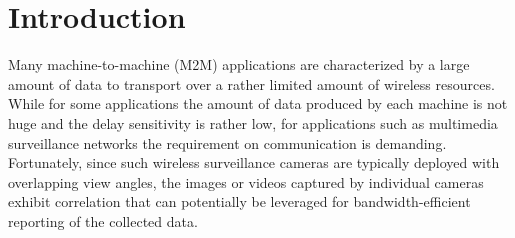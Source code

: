 \section{Introduction}
\label{sec::Introduction}


Many machine-to-machine (M2M) applications are characterized by a large amount of
data to transport over a rather limited amount of wireless resources. 
While for some applications the amount of data produced by each machine is not
huge and the delay sensitivity is rather low, for applications such as multimedia
surveillance networks the requirement on communication is demanding.
%
Fortunately, since such wireless surveillance cameras are typically deployed with
overlapping view angles, the images or videos captured by individual cameras exhibit
correlation that can potentially be leveraged for bandwidth-efficient reporting of
the collected data.

